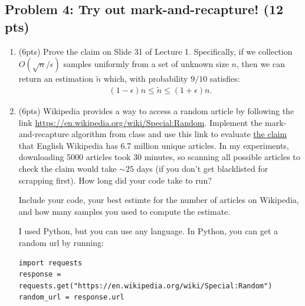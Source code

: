 \documentclass[10pt]{article}
\begin{document}
\subsection{Problem 4: Try out mark-and-recapture! (12 pts)}
\begin{enumerate}
	\item (6pts) Prove the claim on Slide 31 of Lecture 1. Specifically, if we collection $O(\sqrt{n}/\epsilon)$ samples uniformly from a set of unknown size $n$, then we can return an estimation $\tilde{n}$ which, with probability $9/10$ satisfies:
	\begin{align*}
		(1-\epsilon)n \leq \tilde{n} \leq (1+\epsilon)n.
	\end{align*}
	
	\item (6pts) Wikipedia provides a way to access a random article by following the link \url{https://en.wikipedia.org/wiki/Special:Random}. Implement the mark-and-recapture algorithm from class and use this link to evaluate \href{https://en.wikipedia.org/wiki/English_Wikipedia}{the claim} that English Wikipedia has 6.7 million unique articles. In my experiments, downloading 5000 articles took 30 minutes, so scanning all possible articles to check the claim would take $\sim 25$ days (if you don't get blacklisted for scrapping first). How long did your code take to run?
	
	Include your code, your best estimte for the number of articles on Wikipedia, and how many samples you used to compute the estimate. 
	
	 I  used Python, but you can use any language. In Python, you can get a random url by running:
\begin{verbatim}
import requests
response = requests.get("https://en.wikipedia.org/wiki/Special:Random")
random_url = response.url	
\end{verbatim}


\end{enumerate}
\end{document}
